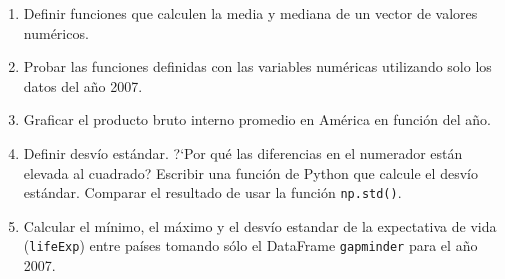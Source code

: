 \documentclass[a4paper,11pt]{article}
\theoremstyle{definition}
\begin{document}
\begin{enumerate}[resume]
\item Definir funciones que calculen la media y mediana de un vector de valores num\'ericos.

\item Probar las funciones definidas con las variables num\'ericas utilizando solo los datos del a\~no 2007.

\item Graficar el producto bruto interno promedio en Am\'erica en funci\'on del a\~no.

\item Definir desv\'io est\'andar. ?`Por qu\'e las diferencias en el numerador est\'an elevada al cuadrado? Escribir una funci\'on de Python que calcule el desv\'io est\'andar. Comparar el resultado de usar la funci\'on \lstinline{np.std()}.

\item Calcular el m\'inimo, el m\'aximo y el desv\'io estandar de la expectativa de vida (\lstinline{lifeExp}) entre pa\'ises tomando s\'olo el DataFrame \lstinline{gapminder} para el a\~no 2007.
\end{enumerate}

%
%
%
%
\end{document}
